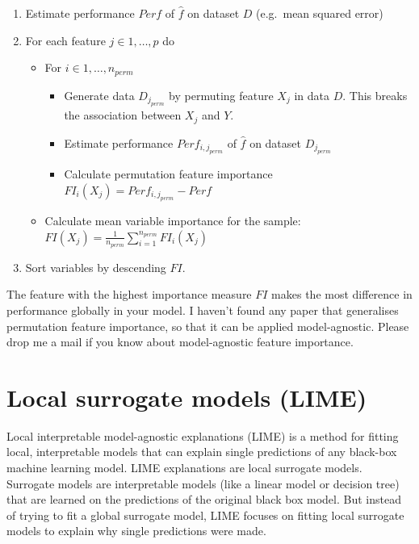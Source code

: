 \documentclass[12pt,]{krantz}
\providecommand{\tightlist}{%
  \setlength{\itemsep}{0pt}\setlength{\parskip}{0pt}}
\theoremstyle{definition}
\theoremstyle{definition}
\theoremstyle{definition}
\theoremstyle{remark}
\begin{document}
\begin{enumerate}
\def\labelenumi{\arabic{enumi}.}
\tightlist
\item
  Estimate performance \(Perf\) of \(\hat{f}\) on dataset \(D\)
  (e.g.~mean squared error)
\item
  For each feature \(j \in 1, \ldots, p\) do

  \begin{itemize}
  \tightlist
  \item
    For \(i \in 1,\ldots , n_{perm}\)

    \begin{itemize}
    \tightlist
    \item
      Generate data \(D_{j_{perm}}\) by permuting feature \(X_j\) in
      data \(D\). This breaks the association between \(X_j\) and \(Y\).
    \item
      Estimate performance \(Perf_{i,j_{perm}}\) of \(\hat{f}\) on
      dataset \(D_{j_{perm}}\)
    \item
      Calculate permutation feature importance
      \(FI_i(X_j) = Perf_{i,j_{perm}} - Perf\)
    \end{itemize}
  \item
    Calculate mean variable importance for the sample:
    \(FI(X_j) = \frac{1}{n_{perm}}\sum_{i=1}^{n_{perm}} FI_i(X_j)\)
  \end{itemize}
\item
  Sort variables by descending \(FI\).
\end{enumerate}

The feature with the highest importance measure \(FI\) makes the most
difference in performance globally in your model. I haven't found any
paper that generalises permutation feature importance, so that it can be
applied model-agnostic. Please drop me a mail if you know about
model-agnostic feature importance.

\section{Local surrogate models
(LIME)}\label{local-surrogate-models-lime}

Local interpretable model-agnostic explanations (LIME) is a method for
fitting local, interpretable models that can explain single predictions
of any black-box machine learning model. LIME explanations are local
surrogate models. Surrogate models are interpretable models (like a
linear model or decision tree) that are learned on the predictions of
the original black box model. But instead of trying to fit a global
surrogate model, LIME focuses on fitting local surrogate models to
explain why single predictions were made.
\end{document}
